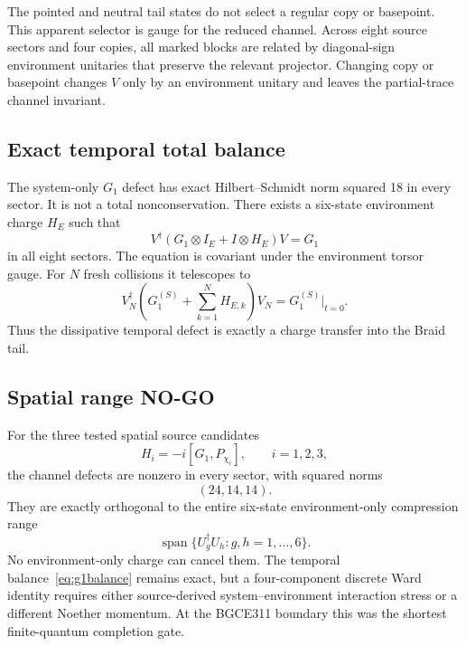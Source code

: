 \documentclass[11pt]{article}
\theoremstyle{definition}
\theoremstyle{remark}
\begin{document}
The pointed and neutral tail states do not select a regular copy or basepoint. This apparent selector is gauge for the reduced channel. Across eight source sectors and four copies, all marked blocks are related by diagonal-sign environment unitaries that preserve the relevant projector. Changing copy or basepoint changes $V$ only by an environment unitary and leaves the partial-trace channel invariant.

\subsection{Exact temporal total balance}

The system-only $G_1$ defect has exact Hilbert--Schmidt norm squared 18 in every sector. It is not a total nonconservation. There exists a six-state environment charge $H_E$ such that
\begin{equation}\label{eq:g1balance}
 V^{\dagger}(G_1\otimes I_E+I\otimes H_E)V=G_1
\end{equation}
in all eight sectors. The equation is covariant under the environment torsor gauge. For $N$ fresh collisions it telescopes to
\begin{equation}\label{eq:telescope}
 V_N^{\dagger}\left(G_1^{(S)}+\sum_{k=1}^{N}H_{E,k}\right)V_N
 =G_1^{(S)}\big|_{t=0}.
\end{equation}
Thus the dissipative temporal defect is exactly a charge transfer into the Braid tail.

\subsection{Spatial range NO-GO}

For the three tested spatial source candidates
\begin{equation}
 H_i=-i[G_1,P_{\chi_i}],\qquad i=1,2,3,
\end{equation}
the channel defects are nonzero in every sector, with squared norms
\begin{equation}
 (24,14,14).
\end{equation}
They are exactly orthogonal to the entire six-state environment-only compression range
\begin{equation}
 \operatorname{span}\{U_g^{\dagger}U_h:g,h=1,\ldots,6\}.
\end{equation}
No environment-only charge can cancel them. The temporal balance~\eqref{eq:g1balance} remains exact, but a four-component discrete Ward identity requires either source-derived system--environment interaction stress or a different Noether momentum. At the BGCE311 boundary this was the shortest finite-quantum completion gate.
\end{document}
